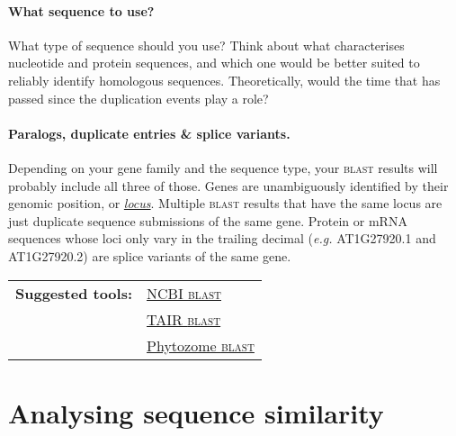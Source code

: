 \documentclass[11pt]{article}
\begin{document}
	\paragraph*{What sequence to use?} 
	What type of sequence should you use? Think about what characterises nucleotide and protein sequences, and which one would be better suited to reliably identify homologous sequences. Theoretically, would the time that has passed since the duplication events play a role?
	
	\paragraph*{Paralogs, duplicate entries \& splice variants.} 
	Depending on your gene family and the sequence type, your \textsc{blast} results will probably include all three of those. 
	Genes are unambiguously identified by their genomic position, or \href{https://www.arabidopsis.org/portals/nomenclature/guidelines.jsp#locus}{\textit{locus}}.
	Multiple \textsc{blast} results that have the same locus are just duplicate sequence submissions of the same gene. Protein or mRNA sequences whose loci only vary in the trailing decimal (\textit{e.g.} AT1G27920.1 and AT1G27920.2) are splice variants of the same gene.
	
	\vspace*{\baselineskip}
	
	\noindent\begin{tabular}{@{}ll}
		\textbf{Suggested tools:}	& \href{https://blast.ncbi.nlm.nih.gov/Blast.cgi}{NCBI \textsc{blast}} \\ 
		&  \href{https://www.arabidopsis.org/Blast/}{TAIR \textsc{blast}} \\ 
		&  \href{https://phytozome.jgi.doe.gov/pz/portal.html#!search?show=BLAST}{Phytozome \textsc{blast}}\\ 
	\end{tabular} 
	
	\section{Analysing sequence similarity\label{sec:phylo}}
	
\end{document}
